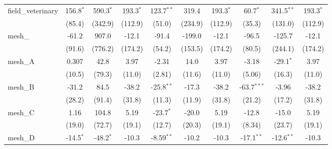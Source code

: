\begin{tabular}{lccccccccc}
   field\_veterinary                                           & 156.8$^{*}$     & 590.3$^{*}$     & 193.3$^{*}$    & 123.7$^{**}$  & 319.4         & 193.3$^{*}$    & 60.7$^{*}$     & 341.5$^{**}$  & 193.3$^{*}$\\   
                                                               & (85.4)          & (342.9)         & (112.9)        & (51.0)        & (234.9)       & (112.9)        & (35.3)         & (131.0)       & (112.9)\\   
   mesh\_                                                      & -61.2           & 907.0           & -12.1          & -91.4         & -199.0        & -12.1          & -96.5          & -125.7        & -12.1\\   
                                                               & (91.6)          & (776.2)         & (174.2)        & (54.2)        & (153.5)       & (174.2)        & (80.5)         & (244.1)       & (174.2)\\   
   mesh\_A                                                     & 0.307           & 42.8            & 3.97           & -2.31         & 14.0          & 3.97           & -3.18          & -29.1$^{*}$   & 3.97\\   
                                                               & (10.5)          & (79.3)          & (11.0)         & (2.81)        & (11.6)        & (11.0)         & (5.06)         & (16.3)        & (11.0)\\   
   mesh\_B                                                     & -31.2           & 84.5            & -38.2          & -25.8$^{**}$  & -17.3         & -38.2          & -63.7$^{***}$  & -3.96         & -38.2\\   
                                                               & (28.2)          & (91.4)          & (31.8)         & (11.3)        & (11.9)        & (31.8)         & (21.2)         & (17.2)        & (31.8)\\   
   mesh\_C                                                     & 1.16            & 104.8           & 5.19           & -23.7$^{*}$   & -20.0         & 5.19           & -12.8          & -15.0         & 5.19\\   
                                                               & (19.0)          & (72.7)          & (19.1)         & (12.7)        & (20.3)        & (19.1)         & (8.34)         & (23.7)        & (19.1)\\   
   mesh\_D                                                     & -14.5$^{*}$     & -48.2$^{*}$     & -10.3          & -8.59$^{**}$  & -10.2         & -10.3          & -17.1$^{**}$   & -12.6$^{**}$  & -10.3\\   

\end{tabular}
